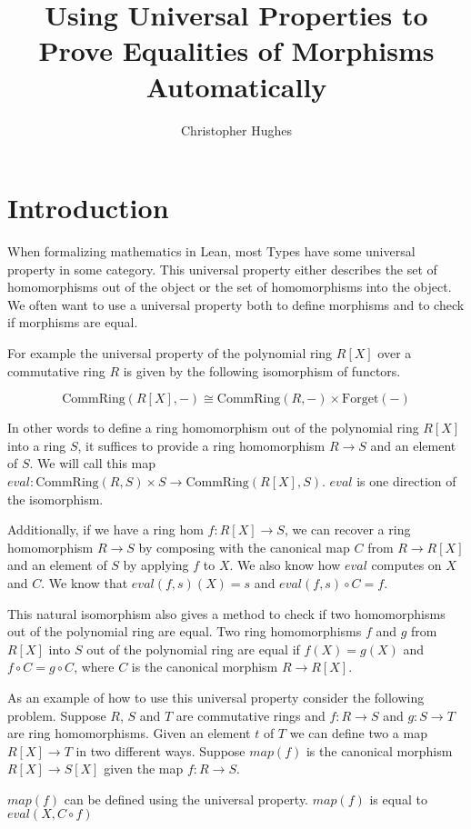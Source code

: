 \documentclass[12pt]{article} %
\title{Using Universal Properties to Prove Equalities of Morphisms Automatically}
\author{Christopher Hughes}
\theoremstyle{definition}
\theoremstyle{definition}
\theoremstyle{definition}
\theoremstyle{definition}
\begin{document}
\section{Introduction}

When formalizing mathematics in Lean, most Types have some universal property in some
category. This universal property either describes the set of homomorphisms out of
the object or the set of homomorphisms into the object. We often want to use a universal
property both to define morphisms and to check if morphisms are equal.

For example the universal property of the polynomial ring $R[X]$ over 
a commutative ring $R$ is given by the following isomorphism of functors.

\begin{equation}
\text{CommRing}(R[X], -) \cong \text{CommRing}(R, -) \times \text{Forget}(-)
\end{equation}

In other words to define a ring homomorphism out of the polynomial ring $R[X]$ 
into a ring $S$, it suffices to provide a ring homomorphism $R \to S$ and 
an element of $S$. We will call this map 
$eval : \text{CommRing}(R, S) \times S \to \text{CommRing}(R[X],S)$.
$eval$ is one direction of the isomorphism.

Additionally, if we have a ring hom $f : R[X] \to S$, we can recover
a ring homomorphism $R \to S$ by composing with the canonical map
$C$ from $R \to R[X]$ and an element of $S$ by applying $f$ to $X$.
We also know how $eval$ computes on $X$ and $C$. We know that
$eval(f, s)(X) = s$ and $eval(f, s) \circ C = f$.

This natural isomorphism also gives a method to check if two
homomorphisms out of the polynomial ring are equal. Two ring homomorphisms
$f$ and $g$ from $R[X]$ into $S$ out of the polynomial ring are equal if 
$f(X) = g(X)$ and $f \circ C = g \circ C$, where $C$ is the canonical 
morphism $R \to R[X]$.

As an example of how to use this universal property consider the following
problem. Suppose $R$, $S$ and $T$ are commutative rings and $f : R \to S$ and
$g : S \to T$ are ring homomorphisms. Given an element $t$ of $T$ we can define
two a map $R[X] \to T$ in two different ways. Suppose $map(f)$ is the canonical 
morphism $R[X] \to S[X]$ given the map $f : R \to S$.

$map(f)$ can be defined using the universal property. $map(f)$ is equal to
$eval(X, C \circ f)$
\end{document}
